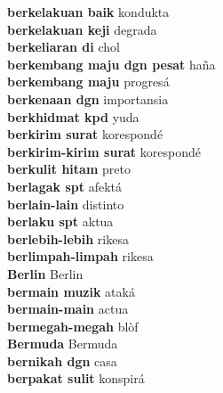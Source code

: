 \textbf{ berkelakuan baik  } kondukta \\
\textbf{ berkelakuan keji  } degrada \\
\textbf{ berkeliaran di  } chol \\
\textbf{ berkembang maju dgn pesat  } haña \\
\textbf{ berkembang maju  } progresá \\
\textbf{ berkenaan dgn  } importansia \\
\textbf{ berkhidmat kpd  } yuda \\
\textbf{ berkirim surat  } korespondé \\
\textbf{ berkirim-kirim surat  } korespondé \\
\textbf{ berkulit hitam  } preto \\
\textbf{ berlagak spt  } afektá \\
\textbf{ berlain-lain  } distinto \\
\textbf{ berlaku spt  } aktua \\
\textbf{ berlebih-lebih  } rikesa \\
\textbf{ berlimpah-limpah  } rikesa \\
\textbf{ Berlin  } Berlin \\
\textbf{ bermain muzik  } ataká \\
\textbf{ bermain-main  } actua \\
\textbf{ bermegah-megah  } blòf \\
\textbf{ Bermuda  } Bermuda \\
\textbf{ bernikah dgn  } casa \\
\textbf{ berpakat sulit  } konspirá \\
